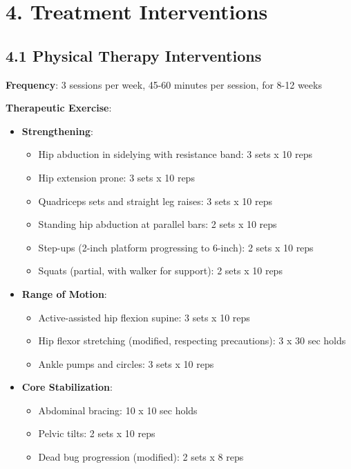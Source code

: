 \documentclass[11pt,letterpaper]{article}
\begin{document}
\section*{4. Treatment Interventions}

\subsection*{4.1 Physical Therapy Interventions}

\textbf{Frequency}: 3 sessions per week, 45-60 minutes per session, for 8-12 weeks

\textbf{Therapeutic Exercise}:
\begin{itemize}[leftmargin=*]
    \item \textbf{Strengthening}:
    \begin{itemize}
        \item Hip abduction in sidelying with resistance band: 3 sets x 10 reps
        \item Hip extension prone: 3 sets x 10 reps
        \item Quadriceps sets and straight leg raises: 3 sets x 10 reps
        \item Standing hip abduction at parallel bars: 2 sets x 10 reps
        \item Step-ups (2-inch platform progressing to 6-inch): 2 sets x 10 reps
        \item Squats (partial, with walker for support): 2 sets x 10 reps
    \end{itemize}

    \item \textbf{Range of Motion}:
    \begin{itemize}
        \item Active-assisted hip flexion supine: 3 sets x 10 reps
        \item Hip flexor stretching (modified, respecting precautions): 3 x 30 sec holds
        \item Ankle pumps and circles: 3 sets x 10 reps
    \end{itemize}

    \item \textbf{Core Stabilization}:
    \begin{itemize}
        \item Abdominal bracing: 10 x 10 sec holds
        \item Pelvic tilts: 2 sets x 10 reps
        \item Dead bug progression (modified): 2 sets x 8 reps
    \end{itemize}
\end{itemize}
\end{document}
